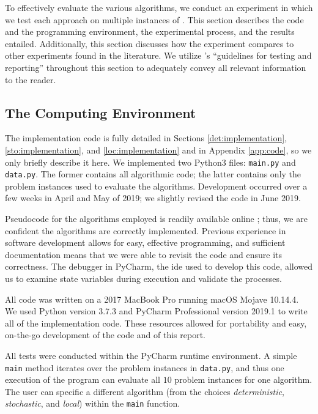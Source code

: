 \documentclass[../main.tex]{subfiles}
\begin{document}
To effectively evaluate the various algorithms, we conduct an experiment in which we test each approach on multiple instances of \prob. This section describes the code and the programming environment, the experimental process, and the results entailed. Additionally, this section discusses how the experiment compares to other experiments found in the literature. We utilize \cite{Barr1995}'s ``guidelines for testing and reporting'' throughout this section to adequately convey all relevant information to the reader.

\subsection{The Computing Environment}

The implementation code is fully detailed in Sections \ref{det:implementation}, \ref{sto:implementation}, and \ref{loc:implementation} and in Appendix \ref{app:code}, so we only briefly describe it here. We implemented two Python3 files: \texttt{main.py} and \texttt{data.py}. The former contains all algorithmic code; the latter contains only the problem instances used to evaluate the algorithms. Development occurred over a few weeks in April and May of 2019; we slightly revised the code in June 2019. 

Pseudocode for the algorithms employed is readily available online \cite{Hart1968, wikipedia:beam-search}; thus, we are confident the algorithms are correctly implemented. Previous experience in software development allows for easy, effective programming, and sufficient documentation means that we were able to revisit the code and ensure its correctness. The debugger in PyCharm, the \ac{ide} used to develop this code, allowed us to examine state variables during execution and validate the processes.

All code was written on a 2017 MacBook Pro running macOS Mojave 10.14.4. We used Python version 3.7.3 and PyCharm Professional version 2019.1 to write all of the implementation code. These resources allowed for portability and easy, on-the-go development of the code and of this report.

All tests were conducted within the PyCharm runtime environment. A simple \texttt{main} method iterates over the problem instances in \texttt{data.py}, and thus one execution of the program can evaluate all $10$ problem instances for one algorithm. The user can specific a different algorithm (from the choices \textit{deterministic}, \textit{stochastic}, and \textit{local}) within the \texttt{main} function.
\end{document}

